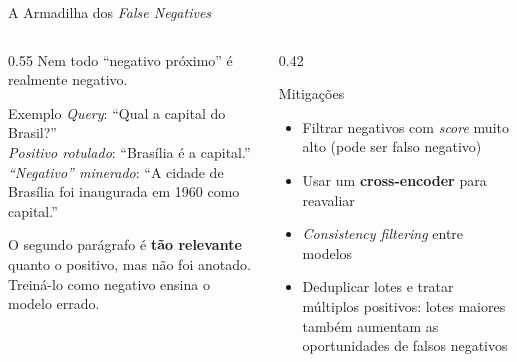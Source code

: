 \documentclass[aspectratio=169, xcolor=dvipsnames]{beamer}
\begin{document}
  \begin{frame}{A Armadilha dos \textit{False Negatives}}
    \begin{columns}
      \begin{column}{0.55\textwidth}
        Nem todo ``negativo próximo'' é realmente negativo.
        \vspace{0.3em}
        \begin{exampleblock}{Exemplo}
          \textit{Query}: ``Qual a capital do Brasil?''\\
          \textit{Positivo rotulado}: ``Brasília é a capital.''\\
          \textit{``Negativo'' minerado}: ``A cidade de Brasília foi inaugurada em 1960 como capital.''
        \end{exampleblock}
        \vspace{0.3em}
        O segundo parágrafo é \textbf{tão relevante} quanto o positivo, mas não foi anotado. Treiná-lo como negativo ensina o modelo errado.
      \end{column}
      \begin{column}{0.42\textwidth}
        \begin{alertblock}{Mitigações}
          \begin{itemize}
            \item Filtrar negativos com \textit{score} muito alto (pode ser falso negativo)
            \item Usar um \textbf{cross-encoder} para reavaliar
            \item \textit{Consistency filtering} entre modelos
            \item Deduplicar lotes e tratar múltiplos positivos: lotes maiores também aumentam as oportunidades de falsos negativos
          \end{itemize}
        \end{alertblock}
      \end{column}
    \end{columns}
  \end{frame}
\end{document}
